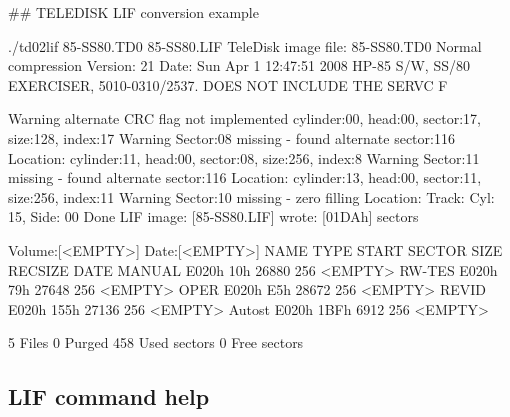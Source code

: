 \#\# T\+E\+L\+E\+D\+I\+SK L\+IF conversion example 
\begin{DoxyPre}
./td02lif 85-SS80.TD0 85-SS80.LIF
TeleDisk image file: 85-SS80.TD0
        Normal compression
        Version: 21
        Date: Sun Apr  1 12:47:51 2008
HP-85 S/W, SS/80 EXERCISER, 5010-0310/2537. DOES NOT INCLUDE THE SERVC F\end{DoxyPre}



\begin{DoxyPre}Warning alternate CRC flag not implemented
        cylinder:00, head:00, sector:17, size:128, index:17
Warning Sector:08 missing - found alternate sector:116
        Location: cylinder:11, head:00, sector:08, size:256, index:8
Warning Sector:11 missing - found alternate sector:116
        Location: cylinder:13, head:00, sector:11, size:256, index:11
Warning Sector:10 missing - zero filling
        Location: Track: Cyl: 15, Side: 00
Done LIF image: [85-SS80.LIF] wrote: [01DAh] sectors\end{DoxyPre}



\begin{DoxyPre}Volume:[<EMPTY>] Date:[<EMPTY>]
NAME         TYPE   START SECTOR        SIZE    RECSIZE   DATE
MANUAL      E020h            10h       26880        256   <EMPTY>
RW-TES      E020h            79h       27648        256   <EMPTY>
OPER        E020h            E5h       28672        256   <EMPTY>
REVID       E020h           155h       27136        256   <EMPTY>
Autost      E020h           1BFh        6912        256   <EMPTY>\end{DoxyPre}



\begin{DoxyPre}       5 Files
       0 Purged
     458 Used sectors
       0 Free sectors\end{DoxyPre}



\begin{DoxyPre}\end{DoxyPre}
 



\subsection*{L\+IF command help}


